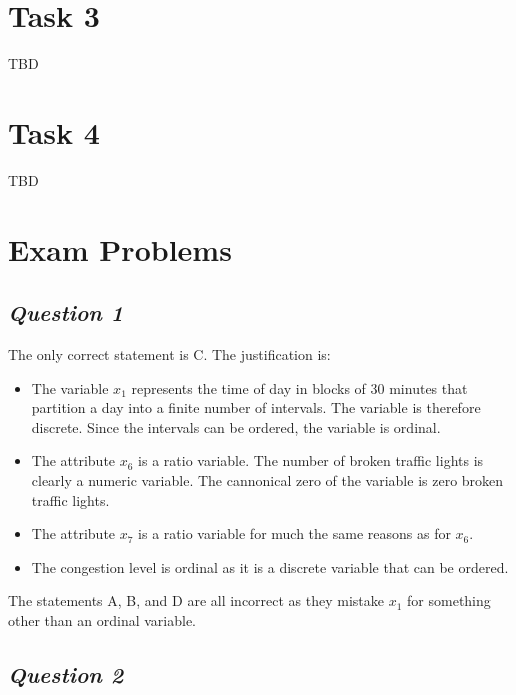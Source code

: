 \documentclass[twoside,11pt]{article}
\makeatletter
\let\@oldsection\section
\renewcommand\section[1]{\@oldsection*{#1}}
\let\@oldsubsection\subsection
\renewcommand\subsection[1]{\@oldsubsection*{\textit{#1}}}
\makeatother
\begin{document}
\section{Task 3}


TBD




\section{Task 4}

TBD

\section{Exam Problems}

\subsection{Question 1}

The only correct statement is C. The justification is:

\begin{itemize}
	\item The variable \(x_1\) represents the time of day in blocks of 30 minutes that partition a day into a finite number of intervals. The variable is therefore discrete. Since the intervals can be ordered, the variable is ordinal.

	\item The attribute \(x_6\) is a ratio variable. The number of broken traffic lights is clearly a numeric variable. The cannonical zero of the variable is zero broken traffic lights.

	\item The attribute \(x_7\) is a ratio variable for much the same reasons as for \(x_6\).

	\item The congestion level is ordinal as it is a discrete variable that can be ordered.
\end{itemize}

The statements A, B, and D are all incorrect as they mistake \(x_1\) for something other than an ordinal variable.

\subsection{Question 2}
\end{document}
